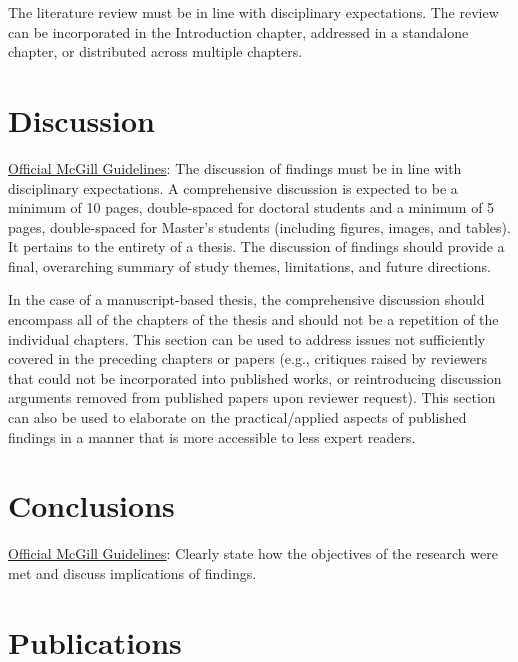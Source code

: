\documentclass[
  letterpaper,
  12pt,
  oneside]{book}
\begin{document}
The literature review must be in line with disciplinary expectations.
The review can be incorporated in the Introduction chapter, addressed in
a standalone chapter, or distributed across multiple chapters.


\chapter{Discussion}\label{discussion}

\href{https://www.mcgill.ca/gps/thesis/thesis-guidelines/preparation}{Official
McGill Guidelines}: The discussion of findings must be in line with
disciplinary expectations. A comprehensive discussion is expected to be
a minimum of 10 pages, double-spaced for doctoral students and a minimum
of 5 pages, double-spaced for Master's students (including figures,
images, and tables). It pertains to the entirety of a thesis. The
discussion of findings should provide a final, overarching summary of
study themes, limitations, and future directions.

In the case of a manuscript-based thesis, the comprehensive discussion
should encompass all of the chapters of the thesis and should not be a
repetition of the individual chapters. This section can be used to
address issues not sufficiently covered in the preceding chapters or
papers (e.g., critiques raised by reviewers that could not be
incorporated into published works, or reintroducing discussion arguments
removed from published papers upon reviewer request). This section can
also be used to elaborate on the practical/applied aspects of published
findings in a manner that is more accessible to less expert readers.


\chapter{Conclusions}\label{conclusions}

\href{https://www.mcgill.ca/gps/thesis/thesis-guidelines/preparation}{Official
McGill Guidelines}: Clearly state how the objectives of the research
were met and discuss implications of findings.


\chapter*{Publications}\label{publications}
\end{document}
